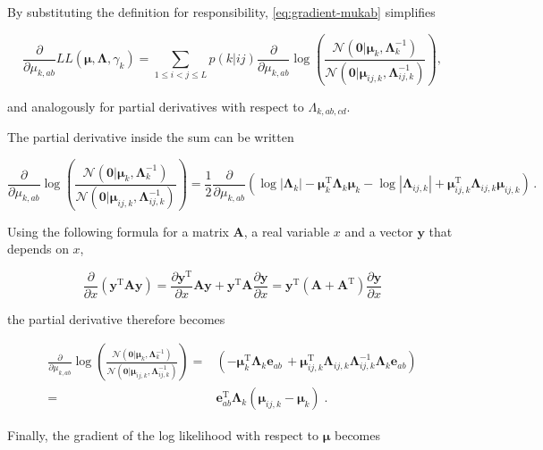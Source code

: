 \documentclass[12pt,a4paper,twoside]{book}
\newcommand{\Gauss}{\mathcal{N}}
\newcommand{\Lijk}{\mathbf{\Lambda}_{ij,k}}
\newcommand{\Lk}{\mathbf{\Lambda}_k}
\newcommand{\muijk}{\mathbf{\mu}_{ij,k}}
\newcommand{\muk}{\mathbf{\mu}_k}
\theoremstyle{definition}
\theoremstyle{definition}
\theoremstyle{remark}
\begin{document}
By substituting the definition for responsibility,
\eqref{eq:gradient-mukab} simplifies

\begin{equation}
  \frac{\partial}{\partial \mu_{k,ab}}  L\!L(\mathbf{\mu}, \mathbf{\Lambda}, \gamma_k)
    = \sum_{1\le i<j\le L}  p(k | ij)  \frac{\partial}{\partial \mu_{k,ab}} \log \left( \frac{ \Gauss(\mathbf{0} | \muk, \Lk^{-1})}{\Gauss( \mathbf{0} | \muijk, \Lijk^{-1})} \right) ,
\label{eq:gradient-LL-mukab}
\end{equation}

and analogously for partial derivatives with respect to
\(\Lambda_{k,ab,cd}\).

The partial derivative inside the sum can be written

\begin{equation}
     \frac{\partial}{\partial \mu_{k,ab}} \log \left( \frac{ \Gauss(\mathbf{0} | \muk, \Lk^{-1})}{\Gauss( \mathbf{0} | \muijk, \Lijk^{-1})} \right)
    = \frac{1}{2}  \frac{\partial}{\partial \mu_{k,ab}}   \left( \log | \Lk | - \muk^\mathrm{T} \Lk \muk - \log | \Lijk | + \muijk^\mathrm{T} \Lijk \muijk \right)\,.
\end{equation}

Using the following formula for a matrix \(\mathbf{A}\), a real variable
\(x\) and a vector \(\mathbf{y}\) that depends on \(x\),

\begin{equation}
    \frac{\partial}{\partial x} \left( \mathbf{y}^\mathrm{T} \mathbf{A} \mathbf{y} \right) = \frac{\partial \mathbf{y}^\mathrm{T}}{\partial x}  \mathbf{A} \mathbf{y} + \mathbf{y}^\mathrm{T} \mathbf{A} \frac{\partial \mathbf{y}}{\partial x}  =  \mathbf{y}^\mathrm{T} (\mathbf{A} + \mathbf{A}^\mathrm{T}) \frac{\partial \mathbf{y}}{\partial x} 
\label{eq:matrix-gradient}
\end{equation}

the partial derivative therefore becomes

\begin{align}
     \frac{\partial}{\partial \mu_{k,ab}} \log \left( \frac{ \Gauss(\mathbf{0} | \muk, \Lk^{-1})}{\Gauss( \mathbf{0} | \muijk, \Lijk^{-1})} \right)
    =& \left( -\muk^\mathrm{T} \Lk \mathbf{e}_{ab} \, +  \muijk^\mathrm{T} \Lijk \Lijk^{-1} \Lk \mathbf{e}_{ab} \right) \\
    =& \mathbf{e}^\mathrm{T}_{ab} \Lk ( \muijk - \muk ) \; . 
\end{align}

Finally, the gradient of the log likelihood with respect to
\(\mathbf{\mu}\) becomes
\end{document}
